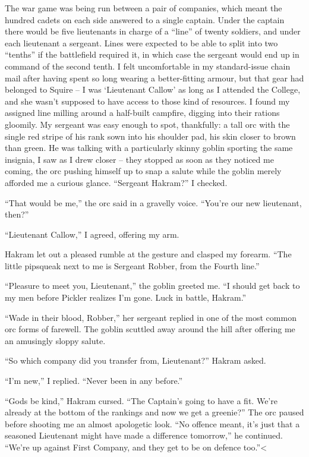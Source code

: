 \documentclass[12pt, openany]{book}
\begin{document}
The war game was being run between a pair of companies, which meant the hundred cadets on each side answered to a single captain. Under the captain there would be five lieutenants in charge of a “line” of twenty soldiers, and under each lieutenant a sergeant. Lines were expected to be able to split into two “tenths” if the battlefield required it, in which case the sergeant would end up in command of the second tenth. I felt uncomfortable in my standard-issue chain mail after having spent so long wearing a better-fitting armour, but that gear had belonged to Squire – I was ‘Lieutenant Callow’ as long as I attended the College, and she wasn’t supposed to have access to those kind of resources. I found my assigned line milling around a half-built campfire, digging into their rations gloomily. My sergeant was easy enough to spot, thankfully: a tall orc with the single red stripe of his rank sown into his shoulder pad, his skin closer to brown than green. He was talking with a particularly skinny goblin sporting the same insignia, I saw as I drew closer – they stopped as soon as they noticed me coming, the orc pushing himself up to snap a salute while the goblin merely afforded me a curious glance. “Sergeant Hakram?” I checked.

“That would be me,” the orc said in a gravelly voice. “You’re our new lieutenant, then?”

“Lieutenant Callow,” I agreed, offering my arm.

Hakram let out a pleased rumble at the gesture and clasped my forearm. “The little pipsqueak next to me is Sergeant Robber, from the Fourth line.”

“Pleasure to meet you, Lieutenant,” the goblin greeted me. “I should get back to my men before Pickler realizes I’m gone. Luck in battle, Hakram.”

“Wade in their blood, Robber,” her sergeant replied in one of the most common orc forms of farewell. The goblin scuttled away around the hill after offering me an amusingly sloppy salute.

“So which company did you transfer from, Lieutenant?” Hakram asked.

“I’m new,” I replied. “Never been in any before.”

“Gods be kind,” Hakram cursed. “The Captain’s going to have a fit. We’re already at the bottom of the rankings and now we get a greenie?” The orc paused before shooting me an almost apologetic look. “No offence meant, it’s just that a seasoned Lieutenant might have made a difference tomorrow,” he continued. “We’re up against First Company, and they get to be on defence too.”<
\end{document}

